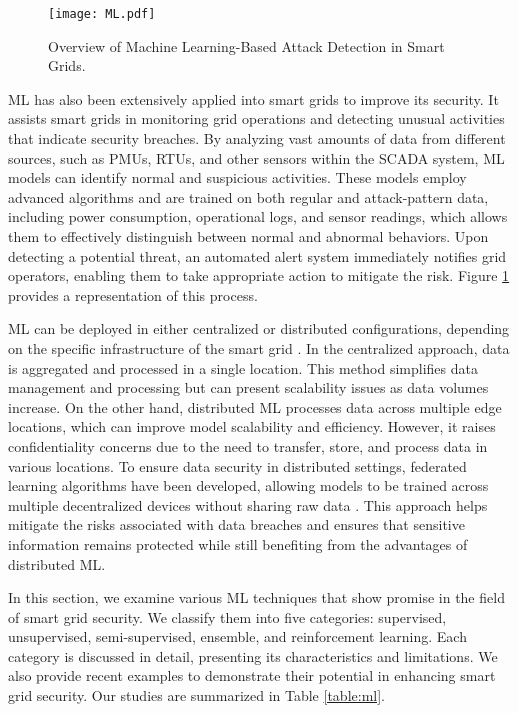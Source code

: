 \documentclass[10pt, journal]{IEEEtran}
\begin{document}
         \begin{figure}[htbp]
			\centerline{\texttt{[image: ML.pdf]}}
			\caption{Overview of Machine Learning-Based Attack Detection in Smart Grids.}
			\label{figure:ML}
        \end{figure}

ML has also been extensively applied into smart grids to improve its security. It assists smart grids in monitoring grid operations and detecting unusual activities that indicate security breaches. By analyzing vast amounts of data from different sources, such as PMUs, RTUs, and other sensors within the SCADA system, ML models can identify normal and suspicious activities. These models employ advanced algorithms and are trained on both regular and attack-pattern data, including power consumption, operational logs, and sensor readings, which allows them to effectively distinguish between normal and abnormal behaviors. Upon detecting a potential threat, an automated alert system immediately notifies grid operators, enabling them to take appropriate action to mitigate the risk. Figure \ref{figure:ML} provides a representation of this process.




ML can be deployed in either centralized or distributed configurations, depending on the specific infrastructure of the smart grid \cite{McMahan2016CommunicationEfficientLO,Lian2017AsynchronousDP,rashvand2024distributed,gholami2024digest}. In the centralized approach, data is aggregated and processed in a single location. This method simplifies data management and processing but can present scalability issues as data volumes increase. On the other hand, distributed ML processes data across multiple edge locations, which can improve model scalability and efficiency. However, it raises confidentiality concerns due to the need to transfer, store, and process data in various locations. To ensure data security in distributed settings, federated learning algorithms have been developed, allowing models to be trained across multiple decentralized devices without sharing raw data \cite{pmlr-v108-bagdasaryan20a,Mothukuri2021ASO,gholami2023fast,gholami2024improved,gholami2023federated,Tolpegin2020DataPA}. This approach helps mitigate the risks associated with data breaches and ensures that sensitive information remains protected while still benefiting from the advantages of distributed ML.



In this section, we examine various ML techniques that show promise in the field of smart grid security. We classify them into five categories: supervised, unsupervised, semi-supervised, ensemble, and reinforcement learning. Each category is discussed in detail, presenting its characteristics and limitations. We also provide recent examples to demonstrate their potential in enhancing smart grid security. Our studies are summarized in Table \ref{table:ml}.
\end{document}
